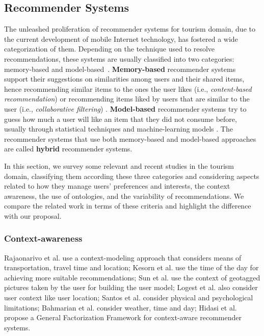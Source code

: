 \subsection{Recommender Systems} \label{section:recommender-systems}

The unleashed proliferation  of recommender systems for tourism domain, due to the current development of mobile Internet technology, has fostered a wide categorization of them. 
Depending on the technique used to resolve recommendations, these systems are usually classified into two categories: memory-based and model-based~\cite{bobadilla2013recommender,sun2019building}. \textbf{Memory-based} recommender systems support their  suggestions on similarities among users and their shared items, hence recommending similar items to the ones the user likes (i.e., \textit{content-based recommendation}) or recommending items liked by users that are similar to the user (i.e., \textit{collaborative filtering}) \cite{ebrahim_2012}. \textbf{Model-based} recommender systems try to guess how much a user will like an item that they did not consume before, usually through statistical techniques and machine-learning models \cite{ebrahim_2012}. The recommender systems that use both memory-based and model-based approaches are called \textbf{hybrid} recommender systems.

In this section, we survey some relevant and recent studies in the tourism domain, classifying them according these three categories and considering aspects related to  how they manage users' preferences and interests, the context awareness, the use of ontologies, and the variability of recommendations. We compare the related work in terms of these criteria and highlight the difference with our proposal.    

\subsubsection{Context-awareness}

Rajaonarivo et al.\cite{rajaonarivo2019rec} use a
context-modeling approach that considers means of transportation, travel time and location; Kesorn et al. \cite{kesorn2017personalized} use the time of the day for achieving more suitable recommendations; Sun et al. \cite{sun2019building} use the context of geotagged pictures taken by the user for building the user model; Logest et al. \cite{logesh2019exploring} \cite{logesh2018personalised} also consider user context like user location; Santos et al. \cite{santos2019using} consider physical and psychological limitations; Bahmarian et al. \cite{bahramian_abbaspour_claramunt_2017} consider weather, time and day; Hidasi et al. \cite{hidasi2016general} propose a General Factorization Framework for context-aware recommender systems.

